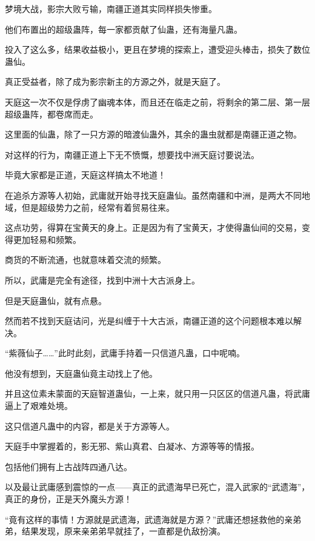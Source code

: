 
\begin{this_body}

梦境大战，影宗大败亏输，南疆正道其实同样损失惨重。

他们布置出的超级蛊阵，每一家都贡献了仙蛊，还有海量凡蛊。

投入了这么多，结果收益极小，更且在梦境的探索上，遭受迎头棒击，损失了数位蛊仙。

真正受益者，除了成为影宗新主的方源之外，就是天庭了。

天庭这一次不仅是俘虏了幽魂本体，而且还在临走之前，将剩余的第二层、第一层超级蛊阵，都卷席而走。

这里面的仙蛊，除了一只方源的暗渡仙蛊外，其余的蛊虫就都是南疆正道之物。

对这样的行为，南疆正道上下无不愤慨，想要找中洲天庭讨要说法。

毕竟大家都是正道，天庭这样搞太不地道！

在追杀方源等人初始，武庸就开始寻找天庭蛊仙。虽然南疆和中洲，是两大不同地域，但是超级势力之前，经常有着贸易往来。

这点功劳，得算在宝黄天的身上。正是因为有了宝黄天，才使得蛊仙间的交易，变得更加轻易和频繁。

商货的不断流通，也就意味着交流的频繁。

所以，武庸是完全有途径，找到中洲十大古派身上。

但是天庭蛊仙，就有点悬。

然而若不找到天庭诘问，光是纠缠于十大古派，南疆正道的这个问题根本难以解决。

“紫薇仙子……”此时此刻，武庸手持着一只信道凡蛊，口中呢喃。

他没有想到，天庭蛊仙竟主动找上了他。

并且这位素未蒙面的天庭智道蛊仙，一上来，就只用一只区区的信道凡蛊，将武庸逼上了艰难处境。

这只信道凡蛊中的内容，都是关于方源等人。

天庭手中掌握着的，影无邪、紫山真君、白凝冰、方源等等的情报。

包括他们拥有上古战阵四通八达。

以及最让武庸感到震惊的一点——真正的武遗海早已死亡，混入武家的“武遗海”，真正的身份，正是天外魔头方源！

“竟有这样的事情！方源就是武遗海，武遗海就是方源？”武庸还想拯救他的亲弟弟，结果发现，原来亲弟弟早就挂了，一直都是仇敌扮演。


\end{this_body}
